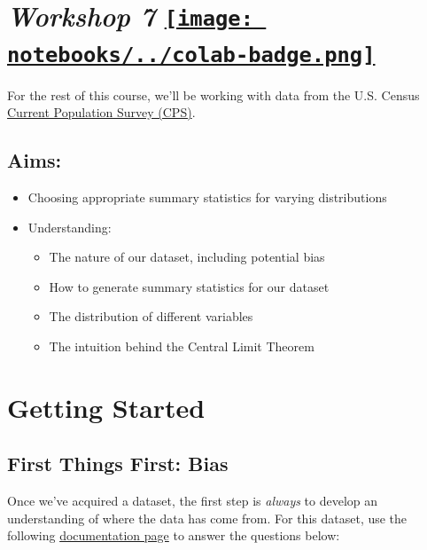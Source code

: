 \documentclass[
  letterpaper,
  DIV=11,
  numbers=noendperiod]{scrreprt}
\providecommand{\tightlist}{%
  \setlength{\itemsep}{0pt}\setlength{\parskip}{0pt}}\usepackage{longtable,booktabs,array}
\begin{document}
\hypertarget{workshop-7-open-in-colab}{%
\section[\emph{Workshop 7} ]{\texorpdfstring{\emph{Workshop 7}
\href{https://colab.research.google.com/github/oballinger/QM2/blob/main/notebooks/W07.\%20Distributions\%20and\%20Basic\%20Statistics.ipynb}{\protect\texttt{[image: notebooks/../colab-badge.png]}}}{Workshop 7 Open In Colab}}\label{workshop-7-open-in-colab}}

For the rest of this course, we'll be working with data from the U.S.
Census \href{https://www.census.gov/programs-surveys/cps.html}{Current
Population Survey (CPS)}.

\hypertarget{aims-3}{%
\subsection{Aims:}\label{aims-3}}

\begin{itemize}
\item
  Choosing appropriate summary statistics for varying distributions
\item
  Understanding:

  \begin{itemize}
  \tightlist
  \item
    The nature of our dataset, including potential bias
  \item
    How to generate summary statistics for our dataset
  \item
    The distribution of different variables
  \item
    The intuition behind the Central Limit Theorem
  \end{itemize}
\end{itemize}

\hypertarget{getting-started-1}{%
\section{Getting Started}\label{getting-started-1}}

\hypertarget{first-things-first-bias}{%
\subsection{First Things First: Bias}\label{first-things-first-bias}}

Once we've acquired a dataset, the first step is \emph{always} to
develop an understanding of where the data has come from. For this
dataset, use the following
\href{https://www.census.gov/programs-surveys/cps/technical-documentation/methodology.html}{documentation
page} to answer the questions below:
\end{document}
